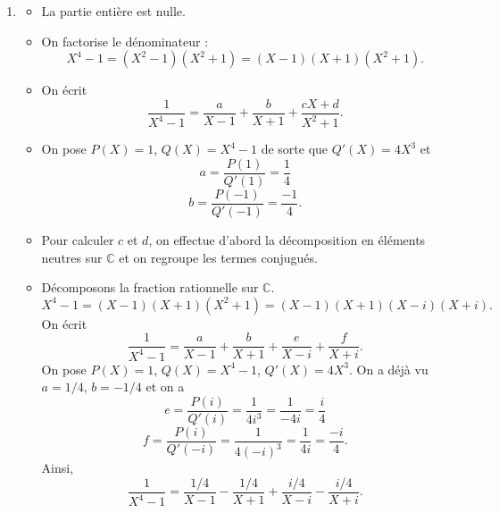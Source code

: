 \documentclass[11pt,a4paper]{article}
\begin{document}
\begin{corrige}
\begin{enumerate}
\begin{itemize}
				\item  Calculons $c$. On multiplie par $(X-1)^2$ et on évalue en $X=1$.
				\begin{eqnarray*}
					\frac{X^2+3X+1}{X-2}&=&\frac{11(X-1)^2}{X-2}+b(X-1)+c\\ 
					\frac{5}{-1}&=& c\implies c=-5.
				\end{eqnarray*}
				On a donc 
				$$\frac{X^2+3X+1}{(X-1)^2(X-2)}=\frac{11}{X-2}+\frac{b}{X-1}+\frac{-5}{(X-1)^2}.$$
				
				\item  Pour calculer $b$, on multiplie par $X$ et on fait tendre $X$ vers l'infini.
				$$\frac{X(X^2+3X+1)}{(X-1)^2(X-2)}=\frac{11X}{X-2}+\frac{bX}{X-1}+\frac{-5X}{(X-1)^2}.$$
				Quand $X\to+\infty,$
				$$1= 11+ b+ 0 \implies b=-10.$$
				Conclusion :
				$$\frac{X^2+3X+1}{(X-1)^2(X-2)}=\frac{11}{X-2}-\frac{10}{X-1}-\frac{5}{(X-1)^2}.$$
				
			\end{itemize}
			
			
			\item  
			\begin{itemize}
				
				\item  La partie entière est nulle.
				
				\item  On factorise le dénominateur : 
				$$X^4-1=(X^2-1)(X^2+1)=(X-1)(X+1)(X^2+1).$$
				
				\item  On écrit 
				$$\frac1{X^4-1}=\frac a{X-1}+\frac{b}{X+1}+\frac{cX+d}{X^2+1}.$$
				
				\item  On pose $P(X)=1$, $Q(X)=X^4-1$ de sorte que $Q'(X)=4X^3$ et
				$$a=\frac{P(1)}{Q'(1)}=\frac14$$
				$$b=\frac{P(-1)}{Q'(-1)}=\frac{-1}{4}.$$
				
				\item  Pour calculer $c$ et $d$, on effectue d'abord la décomposition en éléments neutres sur $\mathbb C$ et on regroupe  les termes conjugués.
				
				\item  Décomposons la fraction rationnelle sur $\mathbb C.$
				$$X^4-1=(X-1)(X+1)(X^2+1)=(X-1)(X+1)(X-i)(X+i).$$
				On écrit 
				$$\frac 1{X^4-1}=\frac{a}{X-1}+\frac{b}{X+1}+\frac{e}{X-i}+\frac{f}{X+i}.$$
				On pose $P(X)=1$, $Q(X)=X^4-1$, $Q'(X)=4X^3.$  On a déjà vu $a=1/4$, $b=-1/4$ et on a 
				$$e=\frac{P(i)}{Q'(i)}=\frac{1}{4i^3}=\frac{1}{-4i}=\frac{i}4$$
				$$f=\frac{P(i)}{Q'(-i)}=\frac{1}{4(-i)^3}=\frac{1}{4i}=\frac{-i}4.$$
				Ainsi, 
				$$\frac 1{X^4-1}=\frac{1/4}{X-1}-\frac{1/4}{X+1}+\frac{i/4}{X-i}-\frac{i/4}{X+i}.$$
				

\end{itemize}
\end{enumerate}
\end{corrige}
\end{document}

